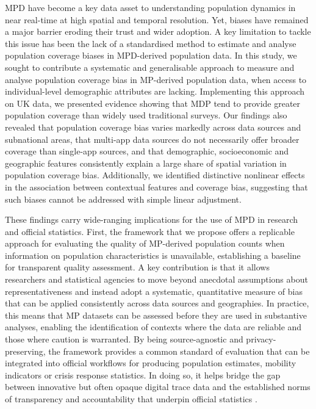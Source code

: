 \documentclass[]{rsos}%
\begin{document}
MPD have become a key data asset to understanding population dynamics in
near real-time at high spatial and temporal resolution. Yet, biases have
remained a major barrier eroding their trust and wider adoption. A key
limitation to tackle this issue has been the lack of a standardised
method to estimate and analyse population coverage biases in MPD-derived population
data. In this study, we sought to contribute a systematic and
generalisable approach to measure and analyse population coverage bias in
MP-derived population data, when access to individual-level demographic
attributes are lacking. Implementing this approach on UK data, we
presented evidence showing that MDP tend to provide greater population
coverage than widely used traditional surveys. Our findings also
revealed that population coverage bias varies markedly across data sources and
subnational areas, that multi-app data sources do not necessarily
offer broader coverage than single-app sources, and that demographic,
socioeconomic and geographic features consistently explain a large share
of spatial variation in population coverage bias. Additionally, we identified
distinctive nonlinear effects in the association between contextual
features and coverage bias, suggesting that such biases cannot be
addressed with simple linear adjustment.

These findings carry wide-ranging implications for the use of MPD in
research and official statistics. First, the framework that we propose
offers a replicable approach for evaluating the quality of MP-derived
population counts when information on population characteristics is
unavailable, establishing a baseline for transparent quality assessment.
A key contribution is that it allows researchers and statistical
agencies to move beyond anecdotal assumptions about representativeness
and instead adopt a systematic, quantitative measure of bias that can be
applied consistently across data sources and geographies. In practice,
this means that MP datasets can be assessed before they are used in
substantive analyses, enabling the identification of contexts where the
data are reliable and those where caution is warranted. By being
source-agnostic and privacy-preserving, the framework provides a common
standard of evaluation that can be integrated into official workflows
for producing population estimates, mobility indicators or crisis
response statistics. In doing so, it helps bridge the gap between
innovative but often opaque digital trace data and the established norms
of transparency and accountability that underpin official statistics
\citep{unstatsMPDMS2025}.
\end{document}
